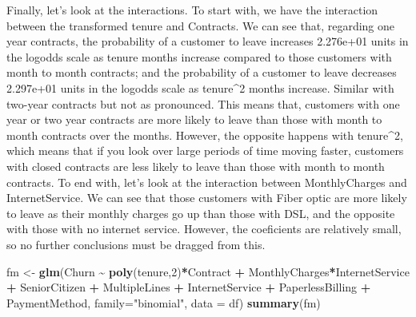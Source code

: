 \documentclass[
]{article}
\newenvironment{Shaded}{\begin{snugshade}}{\end{snugshade}}
\newcommand{\AttributeTok}[1]{\textcolor[rgb]{0.13,0.29,0.53}{#1}}
\newcommand{\DecValTok}[1]{\textcolor[rgb]{0.00,0.00,0.81}{#1}}
\newcommand{\FunctionTok}[1]{\textcolor[rgb]{0.13,0.29,0.53}{\textbf{#1}}}
\newcommand{\NormalTok}[1]{#1}
\newcommand{\OtherTok}[1]{\textcolor[rgb]{0.56,0.35,0.01}{#1}}
\newcommand{\SpecialCharTok}[1]{\textcolor[rgb]{0.81,0.36,0.00}{\textbf{#1}}}
\newcommand{\StringTok}[1]{\textcolor[rgb]{0.31,0.60,0.02}{#1}}
\begin{document}
Finally, let's look at the interactions. To start with, we have the
interaction between the transformed tenure and Contracts. We can see
that, regarding one year contracts, the probability of a customer to
leave increases 2.276e+01 units in the logodds scale as tenure months
increase compared to those customers with month to month contracts; and
the probability of a customer to leave decreases 2.297e+01 units in the
logodds scale as tenure\^{}2 months increase. Similar with two-year
contracts but not as pronounced. This means that, customers with one
year or two year contracts are more likely to leave than those with
month to month contracts over the months. However, the opposite happens
with tenure\^{}2, which means that if you look over large periods of
time moving faster, customers with closed contracts are less likely to
leave than those with month to month contracts. To end with, let's look
at the interaction between MonthlyCharges and InternetService. We can
see that those customers with Fiber optic are more likely to leave as
their monthly charges go up than those with DSL, and the opposite with
those with no internet service. However, the coeficients are relatively
small, so no further conclusions must be dragged from this.

\begin{Shaded}
\begin{Highlighting}[]
\NormalTok{fm }\OtherTok{\textless{}{-}} \FunctionTok{glm}\NormalTok{(Churn }\SpecialCharTok{\textasciitilde{}} \FunctionTok{poly}\NormalTok{(tenure,}\DecValTok{2}\NormalTok{)}\SpecialCharTok{*}\NormalTok{Contract }\SpecialCharTok{+}\NormalTok{ MonthlyCharges}\SpecialCharTok{*}\NormalTok{InternetService }\SpecialCharTok{+}\NormalTok{ SeniorCitizen }\SpecialCharTok{+}\NormalTok{ MultipleLines }\SpecialCharTok{+}\NormalTok{ InternetService }\SpecialCharTok{+}\NormalTok{ PaperlessBilling }\SpecialCharTok{+}\NormalTok{ PaymentMethod, }\AttributeTok{family=}\StringTok{"binomial"}\NormalTok{, }\AttributeTok{data =}\NormalTok{ df)}
\FunctionTok{summary}\NormalTok{(fm)}
\end{Highlighting}
\end{Shaded}
\end{document}
